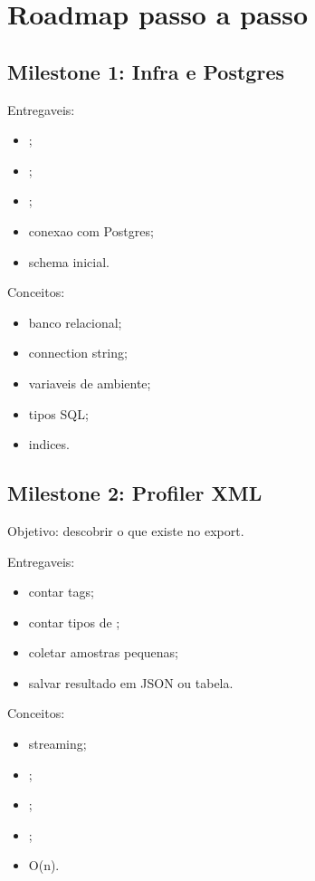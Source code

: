\chapter{Roadmap passo a passo}

\section{Milestone 1: Infra e Postgres}

Entregaveis:

\begin{itemize}
  \item {};
  \item {};
  \item {};
  \item conexao com Postgres;
  \item schema inicial.
\end{itemize}

Conceitos:

\begin{itemize}
  \item banco relacional;
  \item connection string;
  \item variaveis de ambiente;
  \item tipos SQL;
  \item indices.
\end{itemize}

\section{Milestone 2: Profiler XML}

Objetivo: descobrir o que existe no export.

Entregaveis:

\begin{itemize}
  \item contar tags;
  \item contar tipos de ;
  \item coletar amostras pequenas;
  \item salvar resultado em JSON ou tabela.
\end{itemize}

Conceitos:

\begin{itemize}
  \item streaming;
  \item {};
  \item {};
  \item {};
  \item O(n).
\end{itemize}

